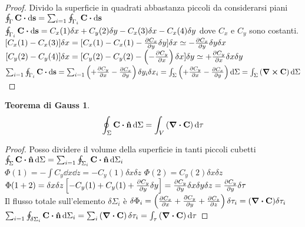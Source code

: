 \documentclass[12pt,a4paper]{article}
\begin{document}
\begin{proof}
    Divido la superficie in quadrati abbastanza piccoli da considerarsi piani
    $\oint_{\Gamma}\vb{C}\vdot \dd{\vb{s}}= \sum_{i=1}\oint_{\Gamma_{i}}\vb{C}\vdot \dd{\vb{s}}$\\
    $\oint_{\Gamma_{i}}\vb{C}\vdot \dd{\vb{s}}= C_{x}(1)\delta x +C_{y}(2)\delta y -C_{x}(3)\delta x -C_{x}(4)\delta y $ dove $C_{x}$ e $C_{y}$ sono costanti.
    \\$[C_{x}(1)-C_{x}(3)]\delta x = [C_{x}(1)-C_{x}(1)-\pdv{C_x}{y}\delta y]\delta x \simeq -\pdv{C_x}{y}\delta y\delta x$
    \\$[C_{y}(2)-C_{y}(4)]\delta x = [C_{y}(2)-C_{y}(2)-\left( -\pdv{C_y}{x} \right)\delta x]\delta y \simeq +\pdv{C_y}{x}\delta x\delta y$
    \\$ \sum_{i=1}\oint_{\Gamma_{i}}\vb{C}\vdot \dd{\vb{s}}= \sum_{i=1}\left( +\pdv{C_y}{x} -\pdv{C_x}{y}\right) \delta y_{i}\delta x_{i}
    = \int_{\Sigma}\left( +\pdv{C_y}{x} -\pdv{C_x}{y}\right) \dd{\Sigma} =  \int_{\Sigma}\left( \curl \vb{C}\right) \dd{\Sigma}  $
\end{proof}

\newtheorem*{TG}{Teorema di Gauss}
\begin{TG}
    \begin{equation*}
        \oint_{\Sigma} \vb{C}\vdot\vu{n}\dd{\Sigma}= \int_{V}\left( \div\vb{C} \right) \dd{\tau}
    \end{equation*}
\end{TG}
\begin{proof}
    Posso dividere il volume della superficie in tanti piccoli cubetti
    \\ $\oint_{\Sigma} \vb{C}\vdot\vu{n}\dd{\Sigma}= \sum_{i=1} \oint_{\Sigma_{i}} \vb{C}\vdot\vu{n} \dd{\Sigma_{i}}$ 
    \\$\Phi(1) = -\int C_{y}\dd{x}\dd{z} =- C_{y}(1)\delta x \delta z$ \quad
    $\Phi(2) =  C_{y}(2)\delta x \delta z$
    \\$\Phi(1+2)= \delta x \delta z\left[ - C_{y}(1) + C_{y}(1)+ \pdv{C_y}{y}\delta y\right]= \pdv{C_y}{y}\delta x \delta y \delta z = \pdv{C_y}{y} \delta \tau $
    \\ Il flusso totale sull'elemento $\delta\Sigma_i$ è $\delta\Phi_i= \left( \pdv{C_x}{x}+\pdv{C_y}{y} +\pdv{C_z}{z}\right)\delta\tau_i= (\div \vb{C})\delta\tau_i$
    \\ $\sum_{i=1}\oint_{\delta\Sigma_i}\vb{C}\vdot\vu{n}\dd{\Sigma_i} = \sum_i \left( \div \vb{C} \right) \delta\tau_i = 
    \int_\tau \left( \div \vb{C} \right)\dd{\tau}$
\end{proof}
\end{document}

